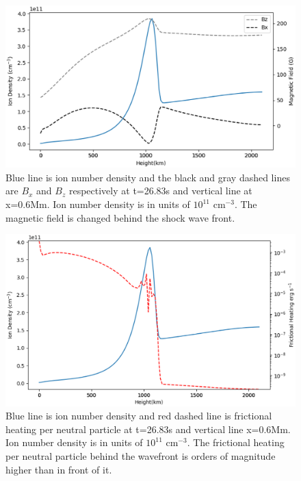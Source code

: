 \documentclass[12pt,upcase]{umlthesis}
\begin{document}
\begin{figure}[ht!]
	\centering
    \includegraphics[width=1\textwidth]{images/spiculefield1d.eps}
    \caption{Blue line is ion number density and the black and gray dashed lines are $B_x$ and $B_z$ respectively at t=26.83s and vertical line at x=0.6Mm. Ion number density is in units of $10^{11}$ cm$^{-3}$. The magnetic field is changed behind the shock wave front.}\label{fig:spiculefield1d}
\end{figure}

\begin{figure}[ht!]
	\centering
    \includegraphics[width=1\textwidth]{images/spiculefriction1d.eps}
    \caption{Blue line is ion number density and red dashed line is frictional heating per neutral particle at t=26.83s and vertical line x=0.6Mm. Ion number density is in units of $10^{11}$ cm$^{-3}$. The frictional heating per neutral particle behind the wavefront is orders of magnitude higher than in front of it.}\label{fig:spiculefriction1d}
\end{figure}
\end{document}
